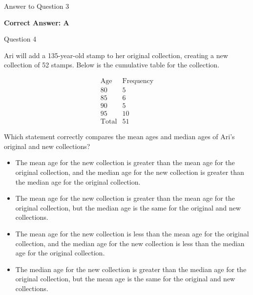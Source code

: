 \documentclass{beamer}
\begin{document}
\begin{frame}{Answer to Question 3}
\

\textbf{Correct Answer: A}

\end{frame}


\begin{frame}{Question 4}
\scriptsize

Ari will add a 135-year-old stamp to her original collection, creating a new collection of 52 stamps. Below is the cumulative table for the collection.

\vspace{0.25cm}

\[
\begin{array}{c|c}
\text{Age} & \text{Frequency}\\
\hline
80 & 5\\
85 & 6\\
90 & 5\\
95 & 10\\
\hline
\text{Total} & 51
\end{array}
\]

\vspace{0.25cm}


Which statement correctly compares the mean ages and median ages of Ari's original and new collections?

\begin{itemize}
    \item[A.] The mean age for the new collection is greater than the mean age for the original collection, and the median age for the new collection is greater than the median age for the original collection.
    \item[B.] The mean age for the new collection is greater than the mean age for the original collection, but the median age is the same for the original and new collections.
    \item[C.] The mean age for the new collection is less than the mean age for the original collection, and the median age for the new collection is less than the median age for the original collection.
    \item[D.] The median age for the new collection is greater than the median age for the original collection, but the mean age is the same for the original and new collections.
\end{itemize}

\end{frame}
\end{document}
